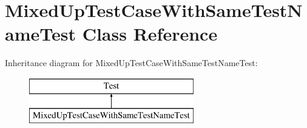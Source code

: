 \hypertarget{classbar_1_1MixedUpTestCaseWithSameTestNameTest}{\section{\-Mixed\-Up\-Test\-Case\-With\-Same\-Test\-Name\-Test \-Class \-Reference}
\label{dd/d7a/classbar_1_1MixedUpTestCaseWithSameTestNameTest}
}
\-Inheritance diagram for \-Mixed\-Up\-Test\-Case\-With\-Same\-Test\-Name\-Test\-:\begin{figure}[H]
\begin{center}
\leavevmode
\includegraphics[height=2.000000cm]{dd/d7a/classbar_1_1MixedUpTestCaseWithSameTestNameTest}
\end{center}
\end{figure}
